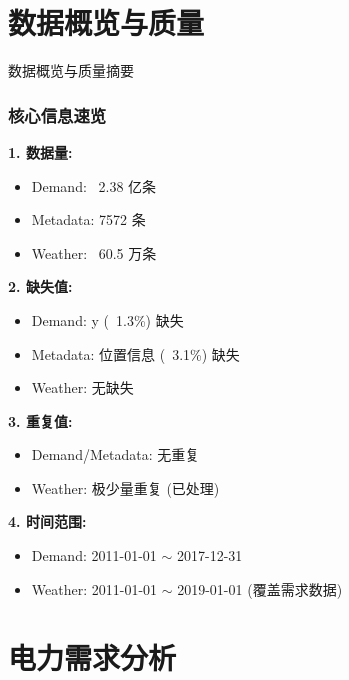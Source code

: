 \documentclass{beamer} %
\begin{document}
\section{数据概览与质量} %

\begin{frame}{数据概览与质量摘要}
    \frametitle{核心信息速览}
    \textbf{1. 数据量:}
    \begin{itemize}
        \item Demand: ~2.38 亿条
        \item Metadata: 7572 条
        \item Weather: ~60.5 万条
    \end{itemize}

    \textbf{2. 缺失值:}
    \begin{itemize}
        \item Demand: y (~1.3\%) 缺失
        \item Metadata: 位置信息 (~3.1\%) 缺失
        \item Weather: 无缺失
    \end{itemize}

    \textbf{3. 重复值:}
    \begin{itemize}
        \item Demand/Metadata: 无重复
        \item Weather: 极少量重复 (已处理)
    \end{itemize}

    \textbf{4. 时间范围:}
    \begin{itemize}
        \item Demand: 2011-01-01 \(\sim\) 2017-12-31
        \item Weather: 2011-01-01 \(\sim\) 2019-01-01 (覆盖需求数据)
    \end{itemize}
\end{frame}

\section{电力需求分析}
\end{document}

